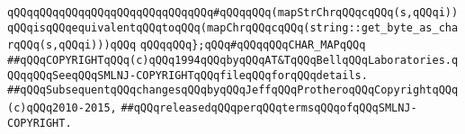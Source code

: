 \verb|qQQqqQQqqQQqqQQqqQQqqQQqqQQqqQQq#qQQqqQQq(mapStrChrqQQqcqQQq(s,qQQqi))qQQqisqQQqequivalentqQQqtoqQQq(mapChrqQQqcqQQq(string::get_byte_as_charqQQq(s,qQQqi)))qQQq|\newline
\newline
\verb|qQQqqQQq};qQQq#qQQqqQQqCHAR_MAPqQQq|\newline
\newline
\newline
\newline
\verb|##qQQqCOPYRIGHTqQQq(c)qQQq1994qQQqbyqQQqAT&TqQQqBellqQQqLaboratories.qQQqqQQqSeeqQQqSMLNJ-COPYRIGHTqQQqfileqQQqforqQQqdetails.|\newline
\verb|##qQQqSubsequentqQQqchangesqQQqbyqQQqJeffqQQqProtheroqQQqCopyrightqQQq(c)qQQq2010-2015,|\newline
\verb|##qQQqreleasedqQQqperqQQqtermsqQQqofqQQqSMLNJ-COPYRIGHT.|\newline

